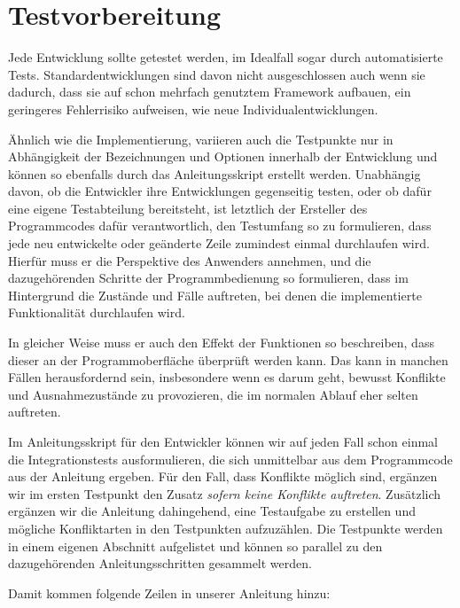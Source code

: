 \section{Testvorbereitung}
Jede Entwicklung sollte getestet werden, im Idealfall sogar durch automatisierte Tests. Standardentwicklungen sind davon nicht ausgeschlossen auch wenn sie dadurch, dass sie auf schon mehrfach genutztem Framework aufbauen, ein geringeres Fehlerrisiko aufweisen, wie neue Individualentwicklungen.

Ähnlich wie die Implementierung, variieren auch die Testpunkte nur in Abhängigkeit der Bezeichnungen und Optionen innerhalb der Entwicklung und können so ebenfalls durch das Anleitungsskript erstellt werden. Unabhängig davon, ob die Entwickler ihre Entwicklungen gegenseitig testen, oder ob dafür eine eigene Testabteilung bereitsteht, ist letztlich der Ersteller des Programmcodes dafür verantwortlich, den Testumfang so zu formulieren, dass jede neu entwickelte oder geänderte Zeile zumindest einmal durchlaufen wird. Hierfür muss er die Perspektive des Anwenders annehmen, und die dazugehörenden Schritte der Programmbedienung so formulieren, dass im Hintergrund die Zustände und Fälle auftreten, bei denen die implementierte Funktionalität durchlaufen wird.

In gleicher Weise muss er auch den Effekt der Funktionen so beschreiben, dass dieser an der Programmoberfläche überprüft werden kann. Das kann in manchen Fällen herausfordernd sein, insbesondere wenn es darum geht, bewusst Konflikte und Ausnahmezustände zu provozieren, die im normalen Ablauf eher selten auftreten.

Im Anleitungsskript für den Entwickler können wir auf jeden Fall schon einmal die Integrationstests ausformulieren, die sich unmittelbar aus dem Programmcode aus der Anleitung ergeben. Für den Fall, dass Konflikte möglich sind, ergänzen wir im ersten Testpunkt den Zusatz \emph{sofern keine Konflikte auftreten}. Zusätzlich ergänzen wir die Anleitung dahingehend, eine Testaufgabe zu erstellen und mögliche Konfliktarten in den Testpunkten aufzuzählen. Die Testpunkte werden in einem eigenen Abschnitt aufgelistet und können so parallel zu den dazugehörenden Anleitungsschritten gesammelt werden.

Damit kommen folgende Zeilen in unserer Anleitung hinzu:

